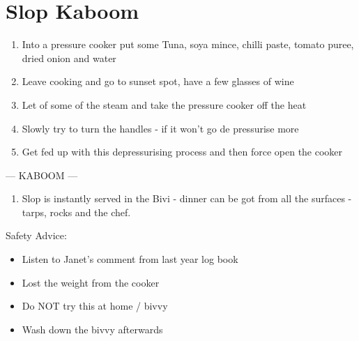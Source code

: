 \section{Slop Kaboom}

\begin{enumerate}
\def\labelenumi{\arabic{enumi}.}
\item
  Into a pressure cooker put some Tuna, soya mince, chilli paste, tomato
  puree, dried onion and water
\item
  Leave cooking and go to sunset spot, have a few glasses of wine
\item
  Let of some of the steam and take the pressure cooker off the heat
\item
  Slowly try to turn the handles - if it won't go de pressurise more
\item
  Get fed up with this depressurising process and then force open the
  cooker
\end{enumerate}

--- KABOOM ---

\begin{enumerate}
\def\labelenumi{\arabic{enumi}.}
\setcounter{enumi}{5}
\item
  Slop is instantly served in the Bivi - dinner can be got from all the
  surfaces - tarps, rocks and the chef.
\end{enumerate}

Safety Advice:

\begin{itemize}
\item
  Listen to Janet's comment from last year log book
\item
  Lost the weight from the cooker
\item
  Do NOT try this at home / bivvy
\item
  Wash down the bivvy afterwards
\end{itemize}

